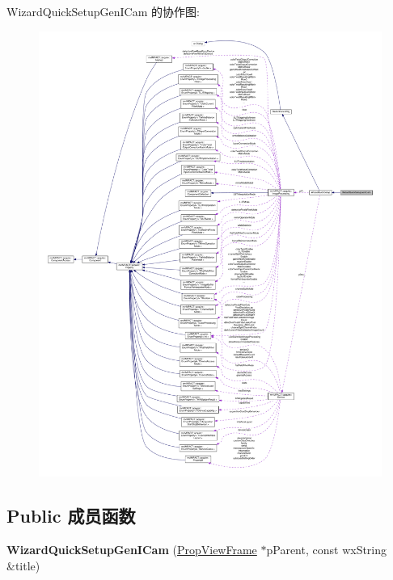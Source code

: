 Wizard\+Quick\+Setup\+Gen\+I\+Cam 的协作图\+:
\nopagebreak
\begin{figure}[H]
\begin{center}
\leavevmode
\includegraphics[width=350pt]{class_wizard_quick_setup_gen_i_cam__coll__graph}
\end{center}
\end{figure}
\subsection*{Public 成员函数}
\begin{DoxyCompactItemize}
\item 
\hypertarget{class_wizard_quick_setup_gen_i_cam_afdf0bd8a4e140a02052479adad4e75ff}{{\bfseries Wizard\+Quick\+Setup\+Gen\+I\+Cam} (\hyperlink{class_prop_view_frame}{Prop\+View\+Frame} $\ast$p\+Parent, const wx\+String \&title)}\label{class_wizard_quick_setup_gen_i_cam_afdf0bd8a4e140a02052479adad4e75ff}

\end{DoxyCompactItemize}

